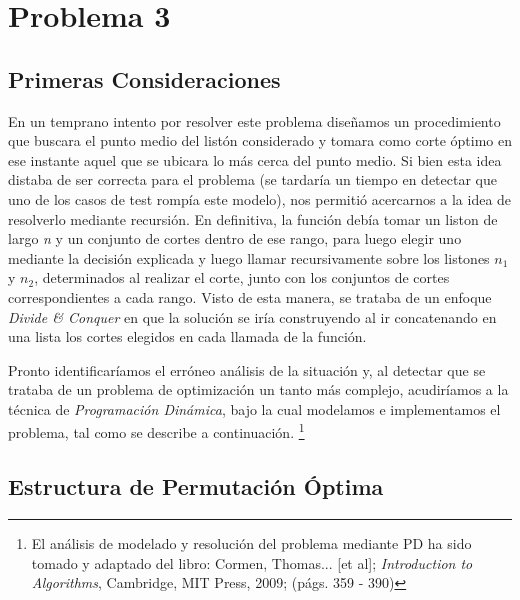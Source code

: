 \section{Problema 3}

\subsection{Primeras Consideraciones}

En un temprano intento por resolver este problema diseñamos un procedimiento que buscara el punto medio del list\'on considerado y tomara como corte \'optimo en ese instante aquel que se ubicara lo m\'as cerca del punto medio. Si bien esta idea distaba de ser correcta para el problema (se tardar\'ia un tiempo en detectar que uno de los casos de test romp\'ia este modelo), nos permiti\'o acercarnos a la idea de resolverlo mediante recursi\'on. En definitiva, la funci\'on deb\'ia tomar un liston de largo \textit{n} y un conjunto de cortes dentro de ese rango, para luego elegir uno mediante la decisi\'on explicada y luego llamar recursivamente sobre los listones \textit{$n_1$} y \textit{$n_2$}, determinados al realizar el corte, junto con los conjuntos de cortes correspondientes a cada rango. Visto de esta manera, se trataba de un enfoque \textit{Divide \& Conquer} en que la soluci\'on se ir\'ia construyendo al ir concatenando en una lista los cortes elegidos en cada llamada de la funci\'on.

\indent Pronto identificar\'iamos el err\'oneo an\'alisis de la situaci\'on y, al detectar que se trataba de un problema de optimizaci\'on un tanto m\'as complejo, acudir\'iamos a la t\'ecnica de \textit{\textsl{Programaci\'on Din\'amica}}, bajo la cual modelamos e implementamos el problema, tal como se describe a continuaci\'on. \footnote{El an\'alisis de modelado y resoluci\'on del problema mediante PD ha sido tomado y adaptado del libro: Cormen, Thomas... [et al]; \textit{Introduction to Algorithms}, Cambridge, MIT Press, 2009; (p\'ags. 359 - 390)}


\subsection{Estructura de Permutaci\'on \'Optima}


